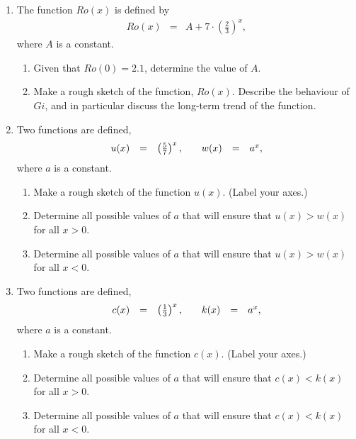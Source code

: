 \begin{enumerate}
\item The function $Ro(x)$ is defined by
  \begin{eqnarray*}
    Ro(x) & = & A + 7 \cdot \left(\frac{2}{3}\right)^x,
  \end{eqnarray*}
  where $A$ is a constant.
  \begin{enumerate}
  \item Given that $Ro(0)=2.1$, determine the value of $A$.
  \item Make a rough sketch of the function, $Ro(x)$. Describe the
    behaviour of $Gi$, and in particular discuss the long-term trend
    of the function.
  \end{enumerate}

\item Two functions are defined,
  \begin{equation*}
    \begin{array}{rcl@{\hspace{2em}}rcl}
      u(x) & = & \left(\frac{5}{7}\right)^x, & w(x) & = & a^x,
    \end{array}
  \end{equation*}
  where $a$ is a constant.
  \begin{enumerate}
  \item Make a rough sketch of the function $u(x)$. (Label your axes.)
  \item Determine all possible values of $a$ that will ensure that
    $u(x)>w(x)$ for all $x>0$.
  \item Determine all possible values of $a$ that will ensure that
    $u(x)>w(x)$ for all $x<0$.
  \end{enumerate}

\item Two functions are defined,
  \begin{equation*}
    \begin{array}{rcl@{\hspace{2em}}rcl}
      c(x) & = & \left(\frac{1}{3}\right)^x, & k(x) & = & a^x,
    \end{array}
  \end{equation*}
  where $a$ is a constant.
  \begin{enumerate}
  \item Make a rough sketch of the function $c(x)$. (Label your axes.)
  \item Determine all possible values of $a$ that will ensure that
    $c(x)<k(x)$ for all $x>0$.
  \item Determine all possible values of $a$ that will ensure that
    $c(x)<k(x)$ for all $x<0$.
  \end{enumerate}
  


\end{enumerate}
